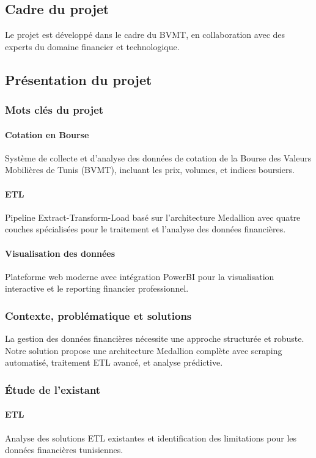 \documentclass[12pt,a4paper]{article}
\begin{document}
\subsection{Cadre du projet}
Le projet est développé dans le cadre du BVMT, en collaboration avec des experts du domaine financier et technologique.

\subsection{Présentation du projet}
\subsubsection{Mots clés du projet}
\paragraph{Cotation en Bourse}
Système de collecte et d'analyse des données de cotation de la Bourse des Valeurs Mobilières de Tunis (BVMT), incluant les prix, volumes, et indices boursiers.

\paragraph{ETL}
Pipeline Extract-Transform-Load basé sur l'architecture Medallion avec quatre couches spécialisées pour le traitement et l'analyse des données financières.

\paragraph{Visualisation des données}
Plateforme web moderne avec intégration PowerBI pour la visualisation interactive et le reporting financier professionnel.

\subsubsection{Contexte, problématique et solutions}
La gestion des données financières nécessite une approche structurée et robuste. Notre solution propose une architecture Medallion complète avec scraping automatisé, traitement ETL avancé, et analyse prédictive.

\subsubsection{Étude de l'existant}
\paragraph{ETL}
Analyse des solutions ETL existantes et identification des limitations pour les données financières tunisiennes.
\end{document}
